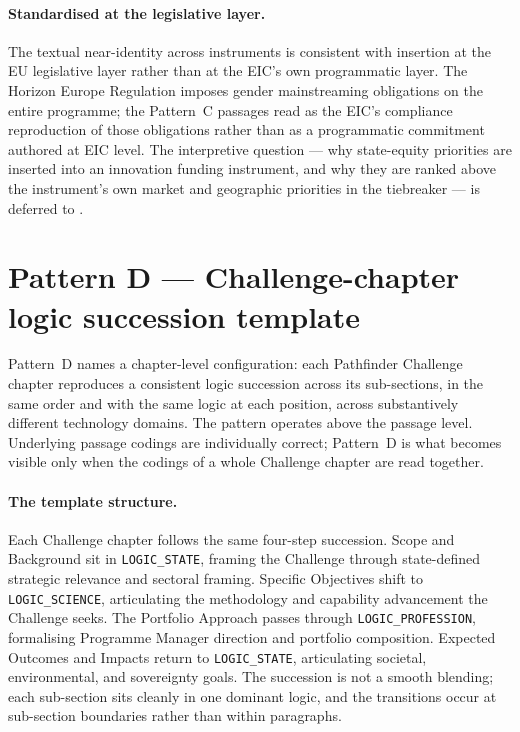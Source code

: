 \paragraph{Standardised at the legislative layer.}
The textual near-identity across instruments is consistent with
insertion at the EU legislative layer rather than at the EIC's own
programmatic layer. The Horizon Europe Regulation imposes gender
mainstreaming obligations on the entire programme; the Pattern~C
passages read as the EIC's compliance reproduction of those
obligations rather than as a programmatic commitment authored at
EIC level. The interpretive question --- why state-equity priorities
are inserted into an innovation funding instrument, and why they are
ranked above the instrument's own market and geographic priorities in
the tiebreaker --- is deferred to .

\section{Pattern D --- Challenge-chapter logic succession template}
\label{sec:res-pattern-d}

Pattern~D names a chapter-level configuration: each Pathfinder
Challenge chapter reproduces a consistent logic succession across its
sub-sections, in the same order and with the same logic at each
position, across substantively different technology domains. The
pattern operates above the passage level. Underlying passage codings
are individually correct; Pattern~D is what becomes visible only when
the codings of a whole Challenge chapter are read together.

\paragraph{The template structure.}
Each Challenge chapter follows the same four-step succession. Scope
and Background sit in \texttt{LOGIC\_STATE}, framing the Challenge
through state-defined strategic relevance and sectoral framing.
Specific Objectives shift to \texttt{LOGIC\_SCIENCE}, articulating the
methodology and capability advancement the Challenge seeks. The
Portfolio Approach passes through \texttt{LOGIC\_PROFESSION},
formalising Programme Manager direction and portfolio composition.
Expected Outcomes and Impacts return to \texttt{LOGIC\_STATE},
articulating societal, environmental, and sovereignty goals. The
succession is not a smooth blending; each sub-section sits cleanly
in one dominant logic, and the transitions occur at sub-section
boundaries rather than within paragraphs.

